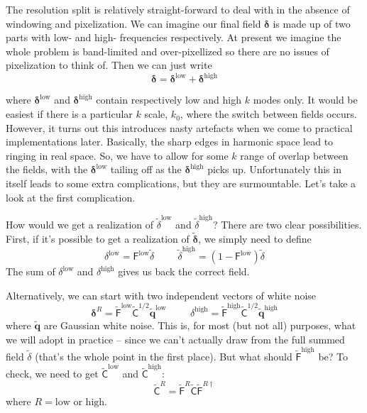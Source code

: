 \documentclass[11pt,a4paper,preprint]{aastex}
\newcommand{\low}{\mathrm{low}}
\newcommand{\high}{\mathrm{high}}
\newcommand{\bmath}[1]{\ensuremath{\bm{#1}}}
\renewcommand{\vec}[1]{\bmath{#1}}
\begin{document}
The resolution split is relatively straight-forward to deal with in
the absence of windowing and pixelization. We can imagine our final
field $\vec{\delta}$ is made up of two parts with low- and high-
frequencies respectively.  At present we imagine the whole problem is
band-limited and over-pixellized so there are no issues of
pixelization to think of. Then we can just write
\begin{equation}
\vec{\delta} = \vec{\delta}^{\low} + \vec{\delta}^{\high}
\end{equation}

where $\vec{\delta}^{\low}$ and $\vec{\delta}^{\high}$ contain
respectively low and high $k$ modes only. It would be easiest if
there is a particular $k$ scale, $k_0$, where the switch between
fields occurs. However, it turns out this introduces nasty
artefacts when we come to practical implementations later. Basically,
the sharp edges in harmonic space lead to ringing in real space.
So, we have to allow for some $k$ range of overlap between the fields,
with the $\vec{\delta}^{\low}$ tailing off as the $\vec{\delta}^{\high}$ picks
up. Unfortunately this in itself leads to some extra complications,
but they are surmountable. Let's take a look at the first complication.

How would we get a realization of $\tilde{\delta}^{\low}$ and $\tilde{\delta}^{\high}$? There
are two clear possibilities. First, if it's possible to get a realization
of $\tilde{\vec{\delta}}$, we simply need to define
\begin{equation}
  \delta^{\low} = \mathsf{F}^{\low} \tilde{\delta} \hspace{1cm} \tilde{\delta}^{\high} = (1 - \mathsf{F}^{\low}) \tilde{\delta}\label{eq:decompose-delta}
\end{equation}
The sum of $\delta^{\low}$ and $\delta^{\high}$ gives us back
the correct field.

Alternatively, we can start with two independent vectors of white noise
\begin{equation}
\vec{\delta}^R = \tilde{\mathsf{F}}^{\low} \tilde{\mathsf{C}}^{1/2} \tilde{\vec{q}}^{\low} \hspace{1cm} \delta^{\high} = \tilde{\mathsf{F}}^{\high} \tilde{\mathsf{C}}^{1/2} \tilde{\vec{q}}^{\high}
\end{equation}
where $\tilde{\vec{q}}$ are Gaussian white
noise. This is, for most (but not all) purposes, what we will adopt in practice -- since
we can't actually draw from the full summed field $\tilde{\delta}$ (that's the whole point in the first place).
But what should $\tilde{\mathsf{F}}^{\high}$ be? To check, we need to
get $\tilde{\mathsf{C}}^{\low}$ and $\tilde{\mathsf{C}}^{\high}$:
\begin{equation}
\tilde{\mathsf{C}}^R = \tilde{\mathsf{F}}^R \tilde{\mathsf{C}} \tilde{\mathsf{F}}^{R\dagger}
\end{equation}
where $R=\low$ or $\high$.
\end{document}
